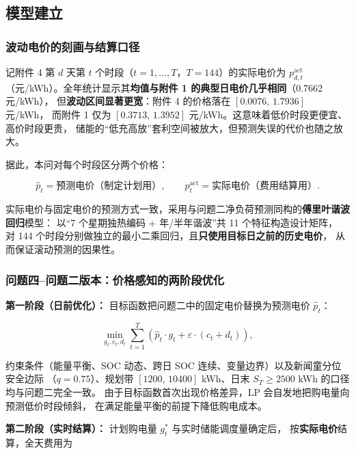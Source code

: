 \documentclass[12pt,a4paper]{article}
\begin{document}
\subsection{模型建立}

\subsubsection{波动电价的刻画与结算口径}

记附件 4 第 $d$ 天第 $t$ 个时段（$t=1,\ldots,T$，$T=144$）的实际电价为 $p_{d,t}^{\text{act}}$
（元/kWh）。全年统计显示其\textbf{均值与附件 1 的典型日电价几乎相同}（0.7662 元/kWh），
但\textbf{波动区间显著更宽}：附件 4 的价格落在 $[0.0076,\,1.7936]$ 元/kWh，
而附件 1 仅为 $[0.3713,\,1.3952]$ 元/kWh。这意味着低价时段更便宜、高价时段更贵，
储能的“低充高放”套利空间被放大，但预测失误的代价也随之放大。

据此，本问对每个时段区分两个价格：

\begin{equation}
    \hat{p}_t = \text{预测电价（制定计划用）}, \qquad
    p_t^{\text{act}} = \text{实际电价（费用结算用）}.
\end{equation}

实际电价与固定电价的预测方式一致，采用与问题二净负荷预测同构的\textbf{傅里叶谐波回归}模型：
以“7 个星期独热编码 + 年/半年谐波”共 11 个特征构造设计矩阵，
对 144 个时段分别做独立的最小二乘回归，且\textbf{只使用目标日之前的历史电价}，
从而保证滚动预测的因果性。

\subsubsection{问题四--问题二版本：价格感知的两阶段优化}

\textbf{第一阶段（日前优化）：} 目标函数把问题二中的固定电价替换为预测电价 $\hat{p}_t$：

\begin{equation}
    \min_{g_t, c_t, d_t} \sum_{t=1}^{T} \left(\hat{p}_t \cdot g_t + \varepsilon \cdot (c_t + d_t)\right),
\end{equation}

约束条件（能量平衡、SOC 动态、跨日 SOC 连续、变量边界）以及新闻童分位安全边际
（$q=0.75$）、规划带 $[1200,\,10400]$ kWh、日末 $S_T \geq 2500$ kWh 的口径均与问题二完全一致。
由于目标函数首次出现价格差异，LP 会自发地把购电量向预测低价时段倾斜，
在满足能量平衡的前提下降低购电成本。

\textbf{第二阶段（实时结算）：} 计划购电量 $g_t^*$ 与实时储能调度量确定后，
按\textbf{实际电价}结算，全天费用为
\end{document}
